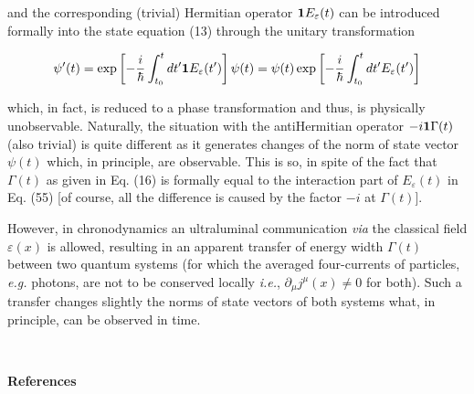 \documentclass[a4paper,12pt]{article}
\begin{document}
\ni and the corresponding (trivial) Hermitian operator ${\bf 1} E_\varepsilon(t)$ can be introduced formally into the state equation (13) through the unitary transformation

\begin{equation}
\psi'(t) =\exp\left[ -\frac{i}{\hbar} \int^t_{t_0} dt' {\bf 1} E_\varepsilon(t') \right] \psi(t) = \psi(t) \exp\left[ -\frac{i}{\hbar} \int^t_{t_0} dt' E_\varepsilon(t') \right] 
\end{equation}

\ni which, in fact, is reduced to a phase transformation and thus, is physically unobservable. Naturally, the situation with the antiHermitian operator $-i{\bf 1} \Gamma(t)$ (also trivial) is quite different as it generates changes of the norm of state vector $\psi(t)$ which, in principle, are observable. This is so, in spite of the fact that $\Gamma(t)$ as given in Eq. (16) is formally equal to the interaction part of $E_\varepsilon(t)$ in Eq. (55) [of course, all the difference is caused by the factor $-i$ at $\Gamma(t)$].

However, in chronodynamics an ultraluminal communication {\it via} the classical field $\varepsilon(x)$ is allowed, resulting in an apparent transfer of energy width $\Gamma(t)$ between two quantum systems (for which the averaged four-currents of particles, {\it e.g.} photons, are not to be conserved locally {\it i.e.}, $\partial_\mu j^\mu(x) \neq 0$ for both). Such a transfer changes slightly the norms of state vectors of both systems what, in principle, can be observed in time.

\vfill\eject

~~~~
\vspace{0.5cm}

{\centerline{\bf References}}

\vspace{0.5cm}
\end{document}
